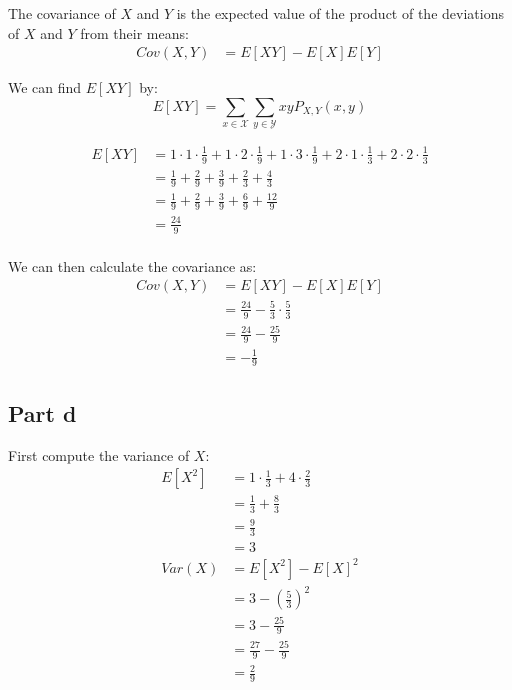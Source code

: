 The covariance of $X$ and $Y$ is the expected value of the product of the deviations of $X$ and $Y$ from their means:
\begin{align*}
	Cov(X, Y) & = E[XY]-E[X]E[Y]
\end{align*}

We can find $E[XY]$ by:
\[
	E[XY] = \sum_{x\in\mathcal{X}}\sum_{y\in\mathcal{Y}}xyP_{X,Y}(x,y)
\]

\begin{align*}
	E[XY] & = 1 \cdot 1 \cdot \frac{1}{9} + 1 \cdot 2 \cdot \frac{1}{9} + 1 \cdot 3 \cdot \frac{1}{9} + 2 \cdot 1 \cdot \frac{1}{3} + 2 \cdot 2 \cdot \frac{1}{3} \\
	      & = \frac{1}{9} + \frac{2}{9} + \frac{3}{9} + \frac{2}{3} + \frac{4}{3}                                                                                 \\
	      & = \frac{1}{9} + \frac{2}{9} + \frac{3}{9} + \frac{6}{9} + \frac{12}{9}                                                                                \\
	      & = \frac{24}{9}                                                                                                                                        \\
\end{align*}

We can then calculate the covariance as:
\begin{align*}
	Cov(X, Y) & = E[XY]-E[X]E[Y]                               \\
	          & = \frac{24}{9} - \frac{5}{3} \cdot \frac{5}{3} \\
	          & = \frac{24}{9} - \frac{25}{9}                  \\
	          & = -\frac{1}{9}
\end{align*}

\subsection{Part d}

First compute the variance of $X$:
\begin{align*}
	E[X^2] & = 1\cdot \frac{1}{3} + 4\cdot \frac{2}{3} \\
	       & = \frac{1}{3} + \frac{8}{3}               \\
	       & = \frac{9}{3}                             \\
	       & = 3                                       \\
	Var(X) & = E[X^2] - E[X]^2                         \\
	       & = 3 - \left(\frac{5}{3}\right)^2          \\
	       & = 3 - \frac{25}{9}                        \\
	       & = \frac{27}{9} - \frac{25}{9}             \\
	       & = \frac{2}{9}
\end{align*}

